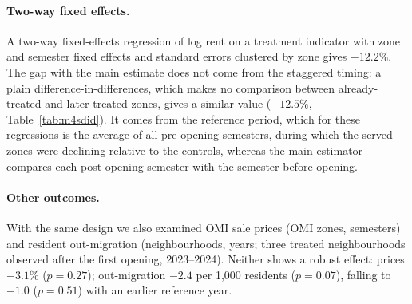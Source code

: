 \begin{table}[tbhp]
\centering
\caption{Effect of the M4 opening on log rents: alternative control groups (Callaway--Sant'Anna)}
\label{tab:m4controls}
\end{table}

\paragraph{Two-way fixed effects.} A two-way fixed-effects regression of log rent on a treatment indicator with zone and semester fixed effects and standard errors clustered by zone gives $-12.2\%$. The gap with the main estimate does not come from the staggered timing: a plain difference-in-differences, which makes no comparison between already-treated and later-treated zones, gives a similar value ($-12.5\%$, Table~\ref{tab:m4sdid}). It comes from the reference period, which for these regressions is the average of all pre-opening semesters, during which the served zones were declining relative to the controls, whereas the main estimator compares each post-opening semester with the semester before opening.

\paragraph{Other outcomes.} With the same design we also examined OMI sale prices (OMI zones, semesters) and resident out-migration (neighbourhoods, years; three treated neighbourhoods observed after the first opening, 2023--2024). Neither shows a robust effect: prices $-3.1\%$ ($p=0.27$); out-migration $-2.4$ per 1,000 residents ($p=0.07$), falling to $-1.0$ ($p=0.51$) with an earlier reference year.

